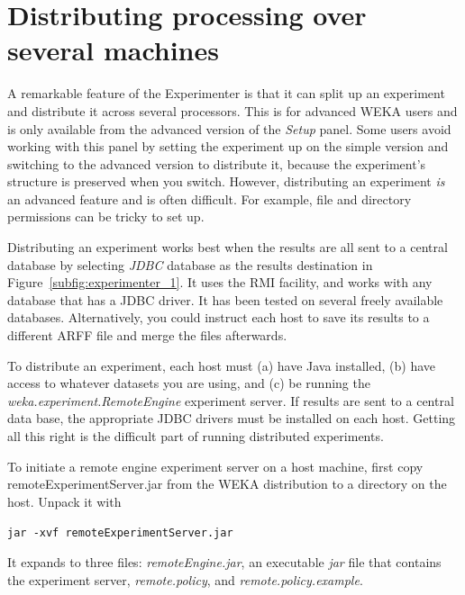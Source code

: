 \section{Distributing processing over several machines}
\label{section:experimenter_distributed}

A remarkable feature of the Experimenter is that it can split up an
experiment and distribute it across several processors. This is for
advanced WEKA users and is only available from the advanced version of
the \textit{Setup} panel. Some users avoid working with this panel by
setting the experiment up on the simple version and switching to the
advanced version to distribute it, because the experiment's structure
is preserved when you switch. However, distributing an experiment
\textit{is} an advanced feature and is often difficult. For example,
file and directory permissions can be tricky to set up.

Distributing an experiment works best when the results are all sent to
a central database by selecting \textit{JDBC} database as the results
destination in Figure~\ref{subfig:experimenter_1}. It uses the RMI
facility, and works with any database that has a JDBC driver. It has
been tested on several freely available databases. Alternatively, you
could instruct each host to save its results to a different ARFF file
and merge the files afterwards.

To distribute an experiment, each host must (a) have Java installed,
(b) have access to whatever datasets you are using, and (c) be running
the \textit{weka.experiment.RemoteEngine} experiment server. If
results are sent to a central data base, the appropriate JDBC drivers
must be installed on each host. Getting all this right is the
difficult part of running distributed experiments.

To initiate a remote engine experiment server on a host machine, first
copy remoteExperimentServer.jar from the WEKA distribution to a
directory on the host. Unpack it with\newline

\verb=jar -xvf remoteExperimentServer.jar=\newline

It expands to three files: \textit{remoteEngine.jar}, an executable
\textit{jar} file that contains the experiment server,
\textit{remote.policy}, and \textit{remote.policy.example}.

